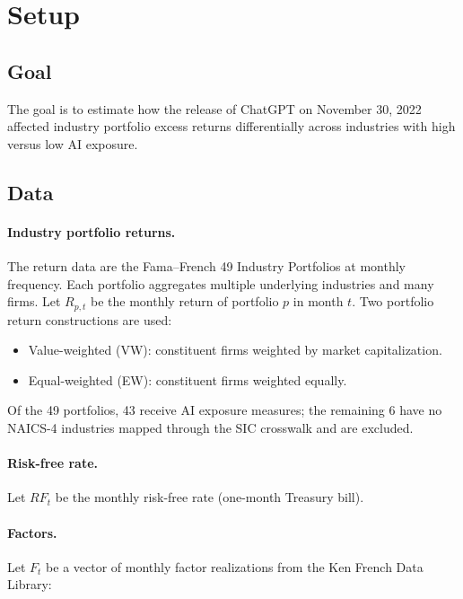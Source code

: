 \documentclass[11pt]{article}
\begin{document}
\section{Setup}

\subsection{Goal}

The goal is to estimate how the release of ChatGPT on November 30, 2022 affected industry portfolio excess returns differentially across industries with high versus low AI exposure.

\subsection{Data}

\paragraph{Industry portfolio returns.}

The return data are the Fama--French 49 Industry Portfolios at monthly frequency. Each portfolio aggregates multiple underlying industries and many firms. Let $R_{p,t}$ be the monthly return of portfolio $p$ in month $t$. Two portfolio return constructions are used:

\begin{itemize}[leftmargin=*]
  \item Value-weighted (VW): constituent firms weighted by market capitalization.
  \item Equal-weighted (EW): constituent firms weighted equally.
\end{itemize}

Of the 49 portfolios, 43 receive AI exposure measures; the remaining 6 have no NAICS-4 industries mapped through the SIC crosswalk and are excluded.

\paragraph{Risk-free rate.}

Let $RF_t$ be the monthly risk-free rate (one-month Treasury bill).

\paragraph{Factors.}

Let $F_t$ be a vector of monthly factor realizations from the Ken French Data Library:
\end{document}
